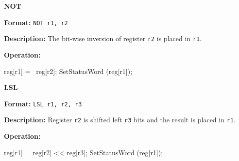 \noindent\textsf{\textbf{\Large NOT}}\par
{}\par\begin{indented}{\bf Format:}
{\tt NOT r1, r2}\par\vspace{3ex}
\end{indented}\vspace{4ex}
\begin{indented}{\bf Description:}
The bit-wise inversion of register {\tt r2} is placed in {\tt r1}.
\end{indented}
\begin{indented}{\bf Operation:}\vspace{.8ex}
\begin{verbatimtab}
reg[r1] = ~reg[r2];
SetStatusWord (reg[r1]);
\end{verbatimtab}
\end{indented}
\vspace{2em}

\newpage
\noindent\textsf{\textbf{\Large LSL}}\par
{}\par\begin{indented}{\bf Format:}
{\tt LSL r1, r2, r3}\par\vspace{3ex}
\end{indented}\vspace{4ex}
\begin{indented}{\bf Description:}
Register {\tt r2} is shifted left {\tt r3} bits and the result is placed
in {\tt r1}.
\end{indented}
\begin{indented}{\bf Operation:}\vspace{.8ex}
\begin{verbatimtab}
reg[r1] = reg[r2] << reg[r3];
SetStatusWord (reg[r1]);
\end{verbatimtab}
\end{indented}
\vspace{2em}

